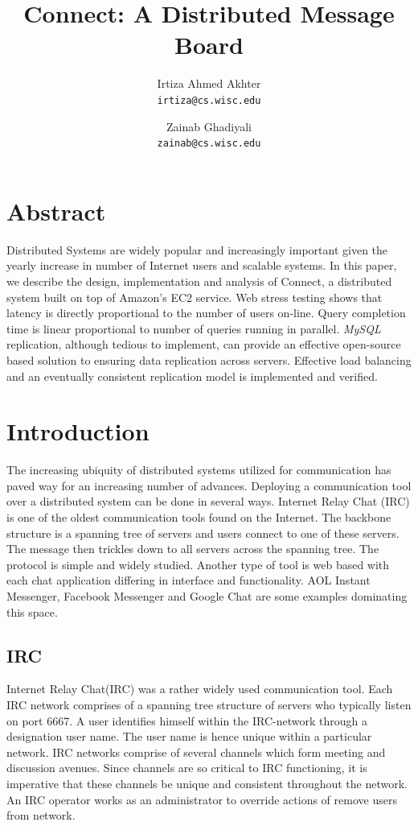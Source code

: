 \documentclass[12pt]{article}
\title{Connect: A Distributed Message Board}
\author{Irtiza Ahmed Akhter\\
\texttt{irtiza@cs.wisc.edu} \and Zainab Ghadiyali\\ \texttt{zainab@cs.wisc.edu}}
\begin{document}
 
\maketitle

\section{Abstract} 

Distributed Systems are widely popular and increasingly
important given the yearly increase in number of Internet users and scalable
systems. In this paper, we describe the design, implementation and analysis of
Connect, a distributed system built on top of Amazon's EC2 service. Web stress
testing shows that latency is directly proportional to the number of users
on-line. Query completion time is linear proportional to number of queries
running in parallel. \emph{MySQL} replication, although tedious to implement, can
provide an effective open-source based solution to ensuring data replication
across servers. Effective load balancing and an eventually consistent replication model 
is implemented and verified.

\section{Introduction} 
\label{Introduction}

The increasing ubiquity of distributed systems utilized for communication has
paved way for an increasing number of advances. Deploying a communication tool
over a distributed system can be done in several ways. Internet Relay Chat (IRC)
is one of the oldest communication tools found on the Internet. The backbone
structure is a spanning tree of servers and users connect to one of these
servers. The message then trickles down to all servers across the spanning tree.
The protocol is simple and widely studied. Another type of tool is web based
with each chat application differing in interface and functionality. AOL Instant
Messenger, Facebook Messenger and Google Chat are some examples dominating this
space.
 
\subsection{IRC} 

Internet Relay Chat(IRC\cite{IRC}) was a rather widely used
communication tool. Each IRC network comprises of a spanning tree structure of
servers who typically listen on port 6667. A user identifies himself within the
IRC-network through a designation user name. The user name is hence unique within
a particular network.  IRC networks comprise of several channels which form
meeting and discussion avenues. Since channels are so critical to IRC
functioning, it is imperative that these channels be unique and consistent
throughout the network. An IRC operator works as an administrator to override actions of
remove users from network.  
\end{document}
